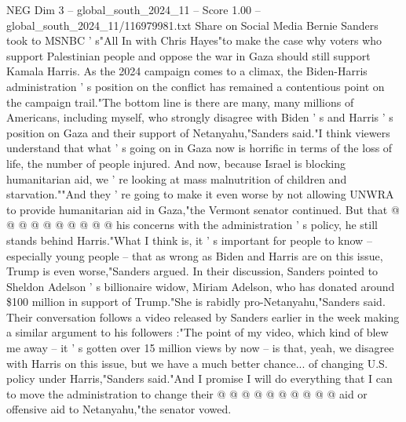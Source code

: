 \begin{textsample}{NEG Dim 3 – global\_south\_2024\_11 – Score 1.00 – global\_south\_2024\_11/116979981.txt}  \label{ex:f3_neg_160}
Share on Social Media Bernie Sanders took to MSNBC ' s"All In with Chris Hayes"to make the case why voters who support Palestinian people and oppose the war in Gaza should still support Kamala Harris.
As the 2024 campaign comes to a climax, the Biden-Harris administration ' s position on the conflict has remained a contentious point on the campaign trail."The bottom line is there are many, many millions of Americans, including myself, who strongly disagree with Biden ' s and Harris ' s position on Gaza and their support of Netanyahu,"Sanders said."I think viewers understand that what ' s going on in Gaza now is horrific in terms of the loss of life, the number of people injured.
And now, because Israel is blocking humanitarian aid, we ' re looking at mass malnutrition of children and starvation.""And they ' re going to make it even worse by not allowing UNWRA to provide humanitarian aid in Gaza,"the Vermont senator continued.
But that @ @ @ @ @ @ @ @ @ @ his concerns with the administration ' s policy, he still stands behind Harris."What I think is, it ' s important for people to know -- especially young people -- that as wrong as Biden and Harris are on this issue, Trump is even worse,"Sanders argued.
In their discussion, Sanders pointed to Sheldon Adelson ' s billionaire widow, Miriam Adelson, who has donated around \$100 million in support of Trump."She is rabidly pro-Netanyahu,"Sanders said.
Their conversation follows a video released by Sanders earlier in the week making a similar argument to his followers :"The point of my video, which kind of blew me away -- it ' s gotten over 15 million views by now -- is that, yeah, we disagree with Harris on this issue, but we have a much better chance... of changing U.S. policy under Harris,"Sanders said."And I promise I will do everything that I can to move the administration to change their @ @ @ @ @ @ @ @ @ @ aid or offensive aid to Netanyahu,"the senator vowed.

\end{textsample}
